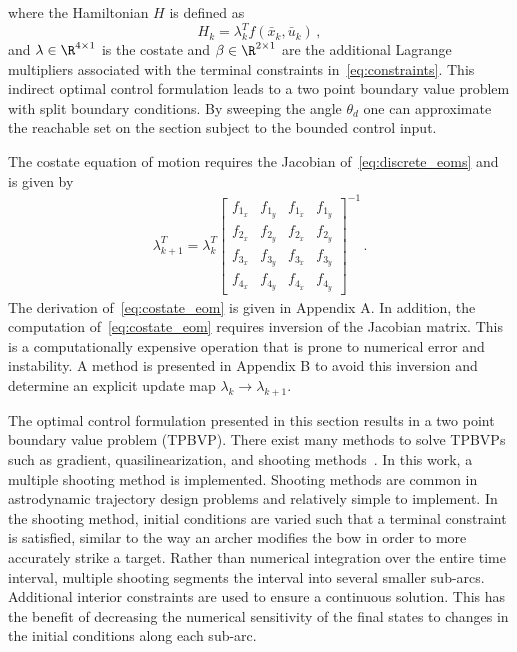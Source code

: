 where the Hamiltonian \(H\) is defined as
\begin{equation}
	H_k = \lambda_k^T f(\bar{x}_k, \bar{u}_k) \, ,
	\label{eq:hamiltonian_opt}
\end{equation}
and \(\lambda \in \R^{4 \times 1}\) is the costate and \(\beta \in \R^{2 \times 1} \) are the additional Lagrange multipliers associated with the terminal constraints in~\cref{eq:constraints}.
This indirect optimal control formulation leads to a two point boundary value problem with split boundary conditions. 
By sweeping the angle \( \theta_d \) one can approximate the reachable set on the \Poincare section subject to the bounded control input. 

The costate equation of motion requires the Jacobian of~\cref{eq:discrete_eoms} and is given by
\begin{align}\label{eq:costate_eom}
	\lambda_{k+1}^T = \lambda_k^T
	\begin{bmatrix} 
		f_{1_x} & f_{1_y} & f_{1_{\dot{x}}} & f_{1_{\dot{y}}} \\
		f_{2_x} & f_{2_y} & f_{2_{\dot{x}}} & f_{2_{\dot{y}}} \\
		f_{3_x} & f_{3_y} & f_{3_{\dot{x}}} & f_{3_{\dot{y}}} \\
		f_{4_x} & f_{4_y} & f_{4_{\dot{x}}} & f_{4_{\dot{y}}}
	\end{bmatrix} ^ {-1} \, .
\end{align}
The derivation of~\cref{eq:costate_eom} is given in Appendix A.
In addition, the computation of~\cref{eq:costate_eom} requires inversion of the Jacobian matrix.
This is a computationally expensive operation that is prone to numerical error and instability.
A method is presented in Appendix B to avoid this inversion and determine an explicit update map \( \lambda_k \to \lambda_{k+1} \).

The optimal control formulation presented in this section results in a two point boundary value problem (TPBVP). 
There exist many methods to solve TPBVPs such as gradient, quasilinearization, and shooting methods~\cite{bryson1975}.
In this work, a multiple shooting method is implemented.
Shooting methods are common in astrodynamic trajectory design problems and relatively simple to implement.
In the shooting method, initial conditions are varied such that a terminal constraint is satisfied, similar to the way an archer modifies the bow in order to more accurately strike a target. 
Rather than numerical integration over the entire time interval, multiple shooting segments the interval into several smaller sub-arcs.
Additional interior constraints are used to ensure a continuous solution.
This has the benefit of decreasing the numerical sensitivity of the final states to changes in the initial conditions along each sub-arc.
